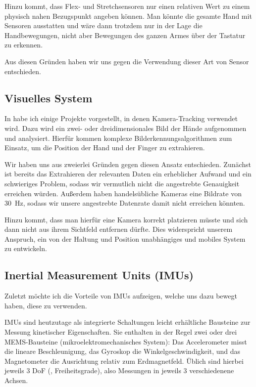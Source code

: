 Hinzu kommt, dass Flex- und Stretchsensoren nur einen relativen Wert zu einem
physisch nahen Bezugspunkt angeben können. Man könnte die gesamte Hand mit
Sensoren ausstatten und wäre dann trotzdem nur in der Lage die Handbewegungen,
nicht aber Bewegungen des ganzen Armes über der Tastatur zu erkennen.

Aus diesen Gründen haben wir uns gegen die Verwendung dieser Art von Sensor
entschieden.

\subsection{Visuelles System}

In  habe ich einige Projekte vorgestellt, in denen
Kamera-Tracking verwendet wird. Dazu wird ein zwei- oder dreidimensionales Bild
der Hände aufgenommen und analysiert. Hierfür kommen komplexe
Bild\-erkennungs\-al\-go\-rith\-men zum Einsatz, um die Position der Hand und
der Finger zu extrahieren.

Wir haben uns aus zweierlei Gründen gegen diesen Ansatz entschieden. Zunächst
ist bereits das Extrahieren der relevanten Daten ein erheblicher Aufwand und
ein schwieriges Problem, sodass wir vermutlich nicht die angestrebte
Genauigkeit erreichen würden. Außerdem haben handelsübliche Kameras eine
Bildrate von \SI{30}{Hz}, sodass wir unsere angestrebte Datenrate damit nicht
erreichen könnten.

Hinzu kommt, dass man hierfür eine Kamera korrekt platzieren müsste und sich
dann nicht aus ihrem Sichtfeld entfernen dürfte. Dies widerspricht unserem
Anspruch, ein von der Haltung und Position unabhängiges und mobiles System zu
entwickeln.

\subsection{Inertial Measurement Units (IMUs)} 

Zuletzt möchte ich die Vorteile von IMUs aufzeigen, welche uns dazu bewegt
haben, diese zu verwenden.

IMUs sind heutzutage als integrierte Schaltungen leicht erhältliche Bausteine
zur Messung kinetischer Eigenschaften. Sie enthalten in der Regel zwei oder
drei MEMS-Bausteine (mikroelektromechanisches System): Das Accelerometer misst
die lineare Beschleunigung, das Gyroskop die Winkelgeschwindigkeit, und das
Magnetometer die Ausrichtung relativ zum Erdmagnetfeld. Üblich sind hierbei
jeweils 3 DoF (, Freiheitsgrade), also Messungen in
jeweils 3 verschiedenene Achsen.


